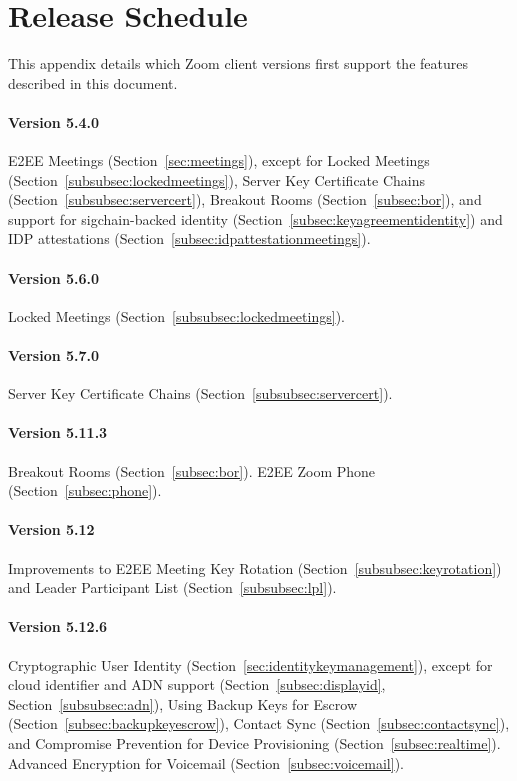 \section{Release Schedule}
\label{appendix:releases}
This appendix details which Zoom client versions first support the features described in this
document.

\paragraph{Version 5.4.0}
E2EE Meetings (Section~\ref{sec:meetings}), except for Locked Meetings
(Section~\ref{subsubsec:lockedmeetings}), Server Key Certificate Chains
(Section~\ref{subsubsec:servercert}), Breakout Rooms (Section~\ref{subsec:bor}), and support for
sigchain-backed identity (Section~\ref{subsec:keyagreementidentity}) and IDP attestations
(Section~\ref{subsec:idpattestationmeetings}).

\paragraph{Version 5.6.0}
Locked Meetings (Section~\ref{subsubsec:lockedmeetings}).

\paragraph{Version 5.7.0}
Server Key Certificate Chains (Section~\ref{subsubsec:servercert}).

\paragraph{Version 5.11.3}
Breakout Rooms (Section~\ref{subsec:bor}). E2EE Zoom Phone (Section~\ref{subsec:phone}).

\paragraph{Version 5.12}
Improvements to E2EE Meeting Key Rotation (Section~\ref{subsubsec:keyrotation}) and Leader Participant List (Section~\ref{subsubsec:lpl}).

\paragraph{Version 5.12.6}
Cryptographic User Identity (Section~\ref{sec:identitykeymanagement}), except for cloud identifier
and ADN support (Section~\ref{subsec:displayid}, Section~\ref{subsubsec:adn}), Using Backup Keys for
Escrow (Section~\ref{subsec:backupkeyescrow}), Contact Sync (Section~\ref{subsec:contactsync}), and
Compromise Prevention for Device Provisioning (Section~\ref{subsec:realtime}). Advanced Encryption
for Voicemail (Section~\ref{subsec:voicemail}).

